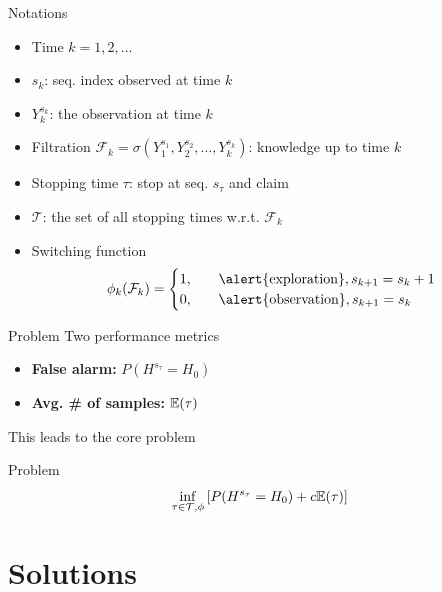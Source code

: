 \documentclass[xcolor={svgnames}]{beamer}
\begin{document}
\begin{frame}{Notations}
  \begin{itemize}
    \item Time $k = 1,2,\dots$
    \item $s_k$: seq. index observed at time $k$
    \item $Y_k^{s_k}$: the observation at time $k$
    \item Filtration $\mathcal{F}_k = \sigma(Y_1^{s_1},Y_2^{s_2},\dots,Y_k^{s_k})$: knowledge up to time $k$
    \item Stopping time $\tau$: stop at seq. $s_{\tau}$ and claim
    \item $\mathcal{T}$: the set of all stopping times w.r.t. $\mathcal{F}_k$
    \item Switching function
    $$
      \phi_k(\mathcal{F}_k) =
      \begin{cases}
        1, &\quad \text{\alert{exploration}}, s_{k+1} = s_k + 1 \\
        0, &\quad \text{\alert{observation}}, s_{k+1} = s_k
      \end{cases}
    $$
  \end{itemize}
\end{frame}
\begin{frame}{Problem}
  Two performance metrics
  \begin{itemize}
    \item \textbf{False alarm:} $P(H^{s_{\tau}} = H_0)$
    \item \textbf{Avg. \# of samples:} $\mathbb{E}{}(\tau)$
  \end{itemize}
  This leads to the core problem
  \begin{block}{Problem}
    \begin{equation}\label{eq:origin}
      \inf_{\tau \in \mathcal{T}, \phi}\left[P(H^{s_{\tau}} = H_0) + c\mathbb{E}{}(\tau)\right]
    \end{equation}
  \end{block}
\end{frame}

\section{Solutions}
\end{document}
